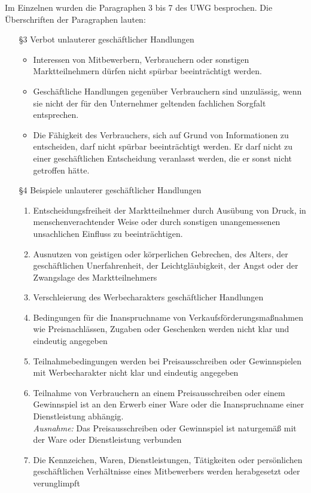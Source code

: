 Im Einzelnen wurden die Paragraphen 3 bis 7 des UWG besprochen. Die Überschriften der Paragraphen lauten:
\begin{itemize}
	\item[§3] Verbot unlauterer geschäftlicher Handlungen
			\begin{itemize}
				\item Interessen von Mitbewerbern, Verbrauchern oder sonstigen Marktteilnehmern dürfen nicht spürbar beeinträchtigt werden.
				\item Geschäftliche Handlungen gegenüber Verbrauchern sind unzulässig, wenn sie nicht der für den Unternehmer geltenden fachlichen Sorgfalt entsprechen.
				\item Die Fähigkeit des Verbrauchers, sich auf Grund von Informationen zu entscheiden, darf nicht spürbar beeinträchtigt werden. Er darf nicht zu einer geschäftlichen Entscheidung veranlasst werden, die er sonst nicht getroffen hätte.
			\end{itemize}
	\item[§4] Beispiele unlauterer geschäftlicher Handlungen
			\begin{enumerate}
				\item Entscheidungsfreiheit der Marktteilnehmer durch Ausübung von Druck, in menschenverachtender Weise oder durch sonstigen unangemessenen unsachlichen Einfluss zu beeinträchtigen.
				\item Ausnutzen von geistigen oder körperlichen Gebrechen, des Alters, der geschäftlichen Unerfahrenheit, der Leichtgläubigkeit, der Angst oder der Zwangslage des Marktteilnehmers
				\item Verschleierung des Werbecharakters geschäftlicher Handlungen
				\item Bedingungen für die Inanspruchname von Verkaufsförderungsmaßnahmen wie Preisnachlässen, Zugaben oder Geschenken werden nicht klar und eindeutig angegeben
				\item Teilnahmebedingungen werden bei Preisausschreiben oder Gewinnspielen mit Werbecharakter nicht klar und eindeutig angegeben
				\item Teilnahme von Verbrauchern an einem Preisausschreiben oder einem Gewinnspiel ist an den Erwerb einer Ware oder die Inanspruchname einer Dienstleistung abhängig. \\
{\it Ausnahme:} Das Preisausschreiben oder Gewinnspiel ist naturgemäß mit der Ware oder Dienstleistung verbunden
				\item Die Kennzeichen, Waren, Dienstleistungen, Tätigkeiten oder persönlichen geschäftlichen Verhältnisse eines Mitbewerbers werden herabgesetzt oder verunglimpft			

\end{enumerate}
\end{itemize}
